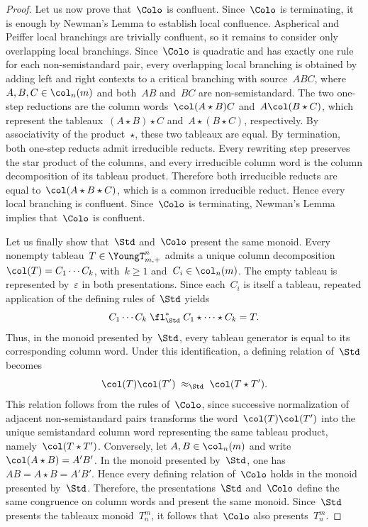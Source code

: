 \documentclass[a4paper, twoside, 11pt, english]{article}
\begin{document}
\begin{proof}
Let us now prove that~$\Colo$ is confluent.
Since~$\Colo$ is terminating, it is enough by Newman's Lemma to establish local confluence.
Aspherical and Peiffer local branchings are trivially confluent, so it remains to consider only overlapping local branchings.
Since~$\Colo$ is quadratic and has exactly one rule for each non-semistandard pair, every overlapping local branching is obtained by adding left and right contexts to a critical branching with source~$ABC$, where~$A,B,C\in\col_n(m)$ and both~$AB$ and~$BC$ are non-semistandard.
The two one-step reductions are the column words~$\col(A\star B)C$ and~$A\col(B\star C)$, which represent the tableaux~$(A\star B)\star C$ and~$A\star(B\star C)$, respectively.
By associativity of the product~$\star$, these two tableaux are equal.
By termination, both one-step reducts admit irreducible reducts.
Every rewriting step preserves the star product of the columns,
and every irreducible column word is the column decomposition
of its tableau product.
Therefore both irreducible reducts are equal to~$\col(A\star B\star C)$, which is a common irreducible reduct.
Hence every local branching is confluent.
Since~$\Colo$ is terminating, Newman's Lemma implies that~$\Colo$ is confluent.


Let us finally show that~$\Std$ and~$\Colo$ present the same monoid.
Every nonempty tableau~$T\in\YoungT_{m,+}^n$ admits a unique column decomposition~$\col(T)=C_1\cdots C_k$, with~$k\ge1$ and~$C_i\in\col_n(m)$. The empty tableau is represented by~$\varepsilon$ in both
presentations.
Since each~$C_i$ is itself a tableau, repeated application of the defining rules of~$\Std$ yields
\[
C_1\cdots C_k \;\fl_\Std^\ast\; C_1\star\cdots\star C_k = T.
\]
Thus, in the monoid presented by~$\Std$, every tableau generator is equal to its corresponding column word.
Under this identification, a defining relation of~$\Std$ becomes
\[
\col(T)\col(T') \;\approx_\Std\; \col(T\star T').
\]
This relation follows from the rules of~$\Colo$, since successive normalization of adjacent non-semistandard pairs transforms the word~$\col(T)\col(T')$ into the unique semistandard column word representing the same tableau product, namely~$\col(T\star T')$.
Conversely, let $A,B\in\col_n(m)$ and write~$\col(A\star B)=A'B'$.
In the monoid presented by~$\Std$, one has~$AB = A\star B = A'B'$.
Hence every defining relation of~$\Colo$ holds in the monoid presented by~$\Std$.
Therefore, the presentations~$\Std$ and~$\Colo$ define the same congruence on column words and present the same monoid.
Since~$\Std$ presents the tableaux monoid~$T_n^m$, it follows that~$\Colo$ also presents~$T_n^m$.
\end{proof}
\end{document}
